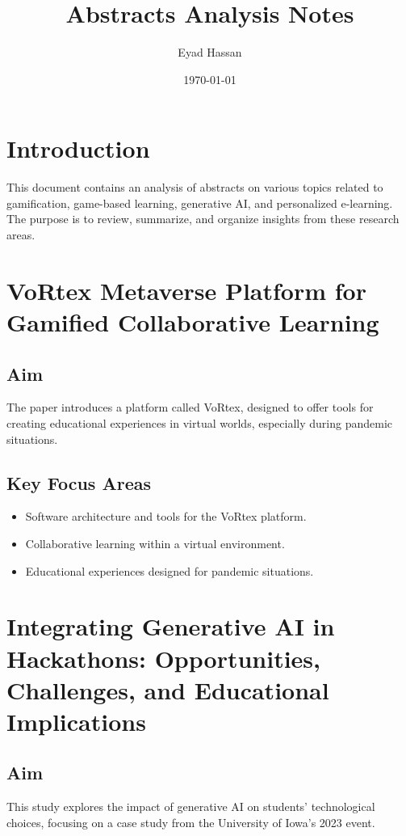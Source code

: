 \documentclass{article}
\title{Abstracts Analysis Notes}
\author{Eyad Hassan}
\date{\today}
\begin{document}
\maketitle

\section{Introduction}
This document contains an analysis of abstracts on various topics related to gamification, game-based learning, generative AI, and personalized e-learning. The purpose is to review, summarize, and organize insights from these research areas.

\newpage


\newpage


\newpage
\section{VoRtex Metaverse Platform for Gamified Collaborative Learning}

\subsection{Aim}
The paper introduces a platform called VoRtex, designed to offer tools for creating educational experiences in virtual worlds, especially during pandemic situations.

\subsection{Key Focus Areas}
\begin{itemize}
    \item Software architecture and tools for the VoRtex platform.
    \item Collaborative learning within a virtual environment.
    \item Educational experiences designed for pandemic situations.
\end{itemize}

\newpage
\section{Integrating Generative AI in Hackathons: Opportunities, Challenges, and Educational Implications}

\subsection{Aim}
This study explores the impact of generative AI on students' technological choices, focusing on a case study from the University of Iowa's 2023 event.
\end{document}
